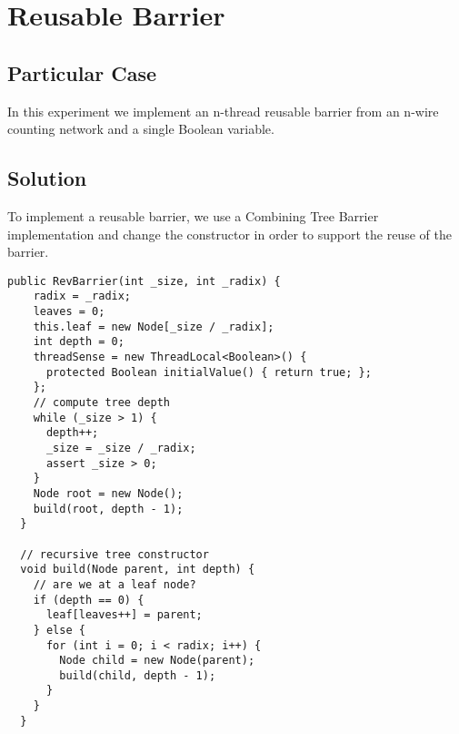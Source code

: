 


\section{\textbf{Reusable Barrier}}



\subsection{Particular Case}
\par
In this experiment we implement an n-thread reusable barrier from an n-wire counting network and a single Boolean variable.
\par



\subsection{Solution}
\par
To implement a reusable barrier, we use a Combining Tree Barrier implementation and change the constructor in order to support the reuse of the barrier. 
\par
\begin{lstlisting}[frame=single,breaklines=true]
  public RevBarrier(int _size, int _radix) {
    radix = _radix;
    leaves = 0;
    this.leaf = new Node[_size / _radix];
    int depth = 0;
    threadSense = new ThreadLocal<Boolean>() {
      protected Boolean initialValue() { return true; };
    };
    // compute tree depth
    while (_size > 1) {
      depth++;
      _size = _size / _radix;
      assert _size > 0;
    }
    Node root = new Node();
    build(root, depth - 1);
  }
  
  // recursive tree constructor
  void build(Node parent, int depth) {
    // are we at a leaf node?
    if (depth == 0) {
      leaf[leaves++] = parent;
    } else {
      for (int i = 0; i < radix; i++) {
        Node child = new Node(parent);
        build(child, depth - 1);
      }
    }
  }
\end{lstlisting}



